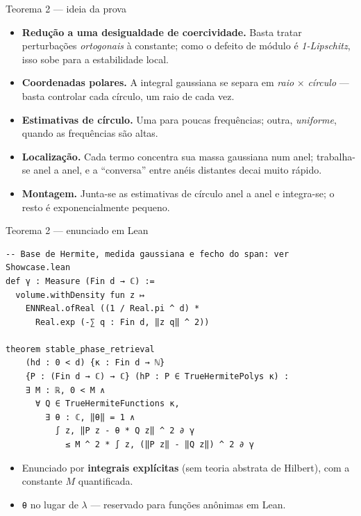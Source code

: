 \documentclass[10pt,aspectratio=169]{beamer}
\newcommand{\hl}[1]{{\color{accent}\textbf{#1}}}
\begin{document}
\begin{frame}{Teorema 2 --- ideia da prova}
  \begin{itemize}\small
    \setlength{\itemsep}{0.5em}
    \item \hl{Redução a uma desigualdade de coercividade.} Basta
          tratar perturbações \emph{ortogonais} à constante; como o
          defeito de módulo é \emph{1-Lipschitz}, isso sobe para a
          estabilidade local.
    \pause
    \item \hl{Coordenadas polares.} A integral gaussiana se separa
          em \emph{raio} $\times$ \emph{círculo} --- basta controlar
          cada círculo, um raio de cada vez.
    \pause
    \item \hl{Estimativas de círculo.} Uma para poucas frequências;
          outra, \emph{uniforme}, quando as frequências são altas.
    \pause
    \item \hl{Localização.} Cada termo concentra sua massa gaussiana
          num anel; trabalha-se anel a anel, e a ``conversa'' entre
          anéis distantes decai muito rápido.
    \pause
    \item \hl{Montagem.} Junta-se as estimativas de círculo anel a
          anel e integra-se; o resto é exponencialmente pequeno.
  \end{itemize}
\end{frame}

\begin{frame}[fragile]{Teorema 2 --- enunciado em Lean}
  \vspace{-0.3em}
\begin{lstlisting}
-- Base de Hermite, medida gaussiana e fecho do span: ver Showcase.lean
def γ : Measure (Fin d → ℂ) :=
  volume.withDensity fun z ↦
    ENNReal.ofReal ((1 / Real.pi ^ d) *
      Real.exp (-∑ q : Fin d, ‖z q‖ ^ 2))

theorem stable_phase_retrieval
    (hd : 0 < d) {κ : Fin d → ℕ}
    {P : (Fin d → ℂ) → ℂ} (hP : P ∈ TrueHermitePolys κ) :
    ∃ M : ℝ, 0 < M ∧
      ∀ Q ∈ TrueHermiteFunctions κ,
        ∃ θ : ℂ, ‖θ‖ = 1 ∧
          ∫ z, ‖P z - θ * Q z‖ ^ 2 ∂ γ
            ≤ M ^ 2 * ∫ z, (‖P z‖ - ‖Q z‖) ^ 2 ∂ γ
\end{lstlisting}
  \vspace{-0.3em}
  \pause
  \begin{itemize}\small
    \item Enunciado por \hl{integrais explícitas} (sem teoria
          abstrata de Hilbert), com a constante $M$ quantificada.
    \item \texttt{θ} no lugar de $\lambda$ --- reservado para
          funções anônimas em Lean.
  \end{itemize}
\end{frame}
\end{document}
